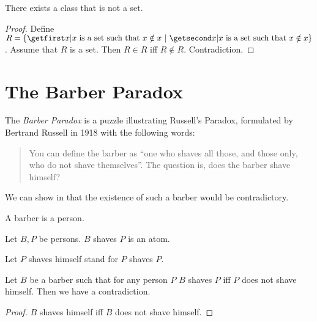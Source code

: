 \documentclass{article}
\begin{document}
  \begin{forthel}
    \begin{theorem*}
      There exists a class that is not a set.
    \end{theorem*}
    \begin{proof}
      Define $R = \class{x | \text{$x$ is a set such that $x \notin x$}}$.
      Assume that $R$ is a set.
      Then $R \in R$ iff $R \notin R$.
      Contradiction.
    \end{proof}
  \end{forthel}


  \section*{The Barber Paradox}

  The \emph{Barber Paradox} is a puzzle illustrating Russell's Paradox,
  formulated by Bertrand Russell in 1918 with the following words:

  \begin{quotation}
    \noindent You can define the barber as \enquote{one who shaves all those,
    and those only, who do not shave themselves}.
    The question is, does the barber shave himself?
  \end{quotation}

  \noindent We can show in \Naproche that the existence of such a barber would
  be contradictory.

  \begin{forthel}
    \begin{signature*}
      A barber is a person.
    \end{signature*}

    \begin{signature*}
      Let $B, P$ be persons.
      $B$ shaves $P$ is an atom.
    \end{signature*}

    Let $P$ shaves himself stand for $P$ shaves $P$.

    \begin{theorem*}
      Let $B$ be a barber such that for any person $P$ $B$ shaves $P$ iff $P$
      does not shave himself.
      Then we have a contradiction.
    \end{theorem*}
    \begin{proof}
      $B$ shaves himself iff $B$ does not shave himself.
    \end{proof}
  \end{forthel}
\end{document}
